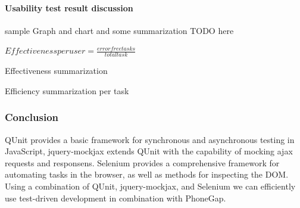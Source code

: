 \paragraph{Usability test result discussion}
sample Graph and chart and some summarization TODO here

$Effectiveness per user=\frac{error free tasks}{total task}$


Effectiveness summarization

Efficiency summarization per task

\subsubsection{Conclusion}

	QUnit provides a basic framework for synchronous and asynchronous testing in
	JavaScript, jquery-mockjax extends QUnit with the capability of mocking ajax
	requests and responsens. Selenium provides a comprehensive framework for
	automating tasks in the browser, as well as methods for inspecting the DOM.
	Using a combination of QUnit, jquery-mockjax, and Selenium we can
	efficiently use test-driven development in combination with PhoneGap.
